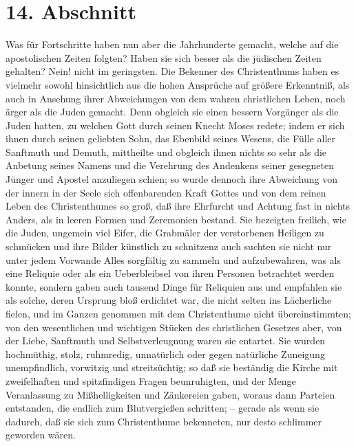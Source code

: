 \section{14. Abschnitt} \label{kap7_ab14}

Was für Fortschritte haben nun aber die Jahrhunderte gemacht, welche auf die
apostolischen Zeiten folgten? Haben sie sich besser als die jüdischen Zeiten
gehalten? Nein! nicht im geringsten. Die Bekenner des Christenthums haben es
vielmehr sowohl hinsichtlich aus die hohen Ansprüche auf größere Erkenntniß, als
auch in Ansehung ihrer Abweichungen von dem wahren christlichen Leben, noch
ärger als die Juden gemacht. Denn obgleich sie einen bessern Vorgänger als die
Juden hatten, zu welchen Gott durch seinen Knecht Moses redete; indem er sich
ihnen durch seinen geliebten Sohn, das Ebenbild seines Wesens, die Fülle aller
Sanftmuth und Demuth, mittheilte und obgleich ihnen nichts so sehr als die
Anbetung seines Namens und die Verehrung des Andenkens seiner gesegneten Jünger
und Apostel anzuliegen schien; so wurde dennoch ihre Abweichung von der innern
in der Seele sich offenbarenden Kraft Gottes und von dem reinen Leben des
Christenthumes so groß, daß ihre Ehrfurcht und Achtung fast in nichts Anders,
als in leeren Formen und Zeremonien bestand. Sie bezeigten freilich, wie die
Juden, ungemein viel Eifer, die Grabmäler der verstorbenen Heiligen zu schmücken
und ihre Bilder künstlich zu schnitzenz auch suchten sie nicht nur unter jedem
Vorwande Alles sorgfältig zu sammeln und aufzubewahren, was als eine Reliquie
oder als ein Ueberbleibsel von ihren Personen betrachtet werden konnte, sondern
gaben auch tausend Dinge für Reliquien aus und empfahlen sie als solche, deren
Ursprung bloß erdichtet war, die nicht selten ins Lächerliche fielen, und im
Ganzen genommen mit dem Christenthume nicht übereinstimmten; von den
wesentlichen und wichtigen Stücken des christlichen Gesetzes aber, von der
Liebe, Sanftmuth und Selbstverleugnung waren sie entartet. Sie wurden
hochmüthig, stolz, ruhmredig, unnatürlich oder gegen natürliche Zuneigung
unempfindlich, vorwitzig und streitsüchtig; so daß sie beständig die Kirche mit
zweifelhaften und spitzfindigen Fragen beunruhigten, und der Menge Veranlassung
zu Mißhelligkeiten und Zänkereien gaben, woraus dann Parteien entstanden, die
endlich zum Blutvergießen schritten; -- gerade als wenn sie dadurch, daß sie
sich zum Christenthume bekenneten, nur desto schlimmer geworden wären.

\medskip

